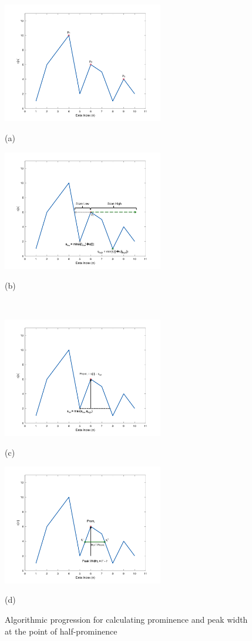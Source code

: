 \begin{figure}[htb]
  \begin{minipage}[t]{0.49\linewidth}\centering
    \includegraphics[width=7cm]{localMax}
    \medskip
    \centerline{(a)}
  \end{minipage}\hfill
  \begin{minipage}[t]{0.49\linewidth}\centering
    \includegraphics[width=7cm]{scan}
    \medskip
    \centerline{(b)}
  \end{minipage}\\
  \begin{minipage}[t]{0.49\linewidth}\centering
    \includegraphics[width=7cm]{calcProm}
    \medskip
    \centerline{(c)}
  \end{minipage}\hfill
  \begin{minipage}[t]{0.49\linewidth}\centering
    \includegraphics[width=7cm]{peakWidth}
    \medskip
    \centerline{(d)}
  \end{minipage}
	\caption{Algorithmic progression for calculating prominence and peak width at the point of half-prominence}
	\label{fig:algProg}
\end{figure}

